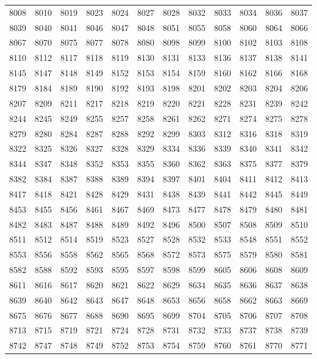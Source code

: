 \begin{center}
\begin{longtable}{llllllllllll}
8008 &8010 &8019 &8023 &8024 &8027 &8028 &8032 &8033 &8034 &8036 &8037 \\
8039 &8040 &8041 &8046 &8047 &8048 &8051 &8055 &8058 &8060 &8064 &8066 \\
8067 &8070 &8075 &8077 &8078 &8080 &8098 &8099 &8100 &8102 &8103 &8108 \\
8110 &8112 &8117 &8118 &8119 &8130 &8131 &8133 &8136 &8137 &8138 &8141 \\
8145 &8147 &8148 &8149 &8152 &8153 &8154 &8159 &8160 &8162 &8166 &8168 \\
8179 &8184 &8189 &8190 &8192 &8193 &8198 &8201 &8202 &8203 &8204 &8206 \\
8207 &8209 &8211 &8217 &8218 &8219 &8220 &8221 &8228 &8231 &8239 &8242 \\
8244 &8245 &8249 &8255 &8257 &8258 &8261 &8262 &8271 &8274 &8275 &8278 \\
8279 &8280 &8284 &8287 &8288 &8292 &8299 &8303 &8312 &8316 &8318 &8319 \\
8322 &8325 &8326 &8327 &8328 &8329 &8334 &8336 &8339 &8340 &8341 &8342 \\
8344 &8347 &8348 &8352 &8353 &8355 &8360 &8362 &8363 &8375 &8377 &8379 \\
8382 &8384 &8387 &8388 &8389 &8394 &8397 &8401 &8404 &8411 &8412 &8413 \\
8417 &8418 &8421 &8428 &8429 &8431 &8438 &8439 &8441 &8442 &8445 &8449 \\
8453 &8455 &8456 &8461 &8467 &8469 &8473 &8477 &8478 &8479 &8480 &8481 \\
8482 &8483 &8487 &8488 &8489 &8492 &8496 &8500 &8507 &8508 &8509 &8510 \\
8511 &8512 &8514 &8519 &8523 &8527 &8528 &8532 &8533 &8548 &8551 &8552 \\
8553 &8556 &8558 &8562 &8565 &8568 &8572 &8573 &8575 &8579 &8580 &8581 \\
8582 &8588 &8592 &8593 &8595 &8597 &8598 &8599 &8605 &8606 &8608 &8609 \\
8611 &8616 &8617 &8620 &8621 &8622 &8629 &8634 &8635 &8636 &8637 &8638 \\
8639 &8640 &8642 &8643 &8647 &8648 &8653 &8656 &8658 &8662 &8663 &8669 \\
8675 &8676 &8677 &8688 &8690 &8695 &8699 &8704 &8705 &8706 &8707 &8708 \\
8713 &8715 &8719 &8721 &8724 &8728 &8731 &8732 &8733 &8737 &8738 &8739 \\
8742 &8747 &8748 &8749 &8752 &8753 &8754 &8759 &8760 &8761 &8770 &8771 \\

\end{longtable}
\end{center}
